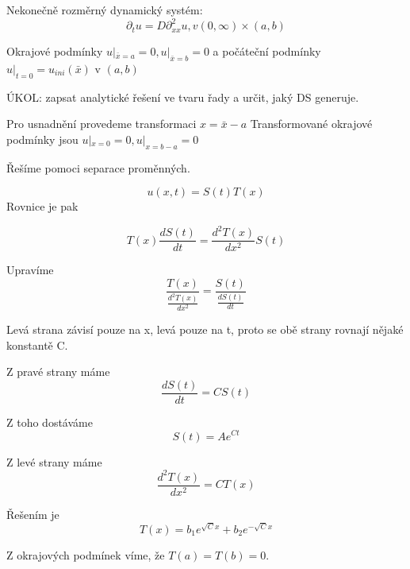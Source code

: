 \documentclass[../main.tex]{subfiles}
\begin{document}
\begin{example}
    Nekonečně rozměrný dynamický systém:
    \begin{equation}
        \partial_t u = D\partial^2_{xx} u, v (0,\infty) \times (a,b)
    \end{equation}

    Okrajové podmínky $u|_{\bar{x}=a} = 0, u|_{\bar{x}=b} = 0$ a počáteční podmínky $u|_{t=0} = u_{ini}(\bar{x})$ v $(a,b)$


    ÚKOL: zapsat analytické řešení ve tvaru řady a určit, jaký DS generuje.   

    Pro usnadnění provedeme transformaci $x=\bar{x}-a$
    Transformované okrajové podmínky jsou $u|_{x=0} = 0, u|_{x=b-a} = 0$

    Řešíme pomoci separace proměnných. 

    \begin{equation}
        u(x,t) = S(t)T(x)
    \end{equation}
    Rovnice je pak 

    \begin{equation}
        T(x) \frac{d S(t)}{dt} = \frac{d^2 T(x)}{dx^2} S(t)
    \end{equation}


    Upravíme
    \begin{equation}
        \frac{T(x)}{\frac{d^2 T(x)}{dx^2}} = \frac{S(t)}{\frac{d S(t)}{dt}}
    \end{equation}

    Levá strana závisí pouze na x, levá pouze na t, proto se obě strany rovnají nějaké konstantě C.

    Z pravé strany máme 
    \begin{equation}
        \frac{d S(t)}{dt} = CS(t)
    \end{equation}

    Z toho dostáváme
    \begin{equation}
        S(t) = A e^{C t}
    \end{equation}

    Z levé strany máme
    \begin{equation}
        \frac{d^2 T(x)}{dx^2} = C T(x)
    \end{equation}

    Řešením je
    \begin{equation}
        T(x) = b_1 e^{\sqrt{C}x} + b_2 e^{-\sqrt{C}x}
    \end{equation}

    Z okrajových podmínek víme, že $T(a) = T(b) = 0$.


\end{example}
\end{document}
